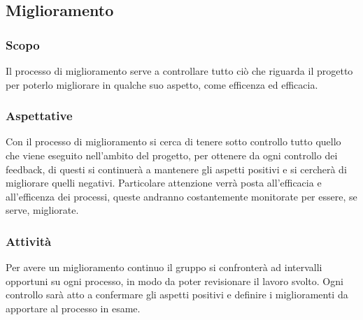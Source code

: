 \subsection{Miglioramento}
\subsubsection{Scopo}
Il processo di miglioramento serve a controllare tutto ciò che riguarda il progetto per poterlo migliorare in qualche suo aspetto, come efficenza ed efficacia.
\subsubsection{Aspettative}
Con il processo di miglioramento si cerca di tenere sotto controllo tutto quello che viene eseguito nell'ambito del progetto, per ottenere da ogni controllo dei feedback, di questi si continuerà a mantenere gli aspetti positivi e si cercherà di migliorare quelli negativi. Particolare attenzione verrà posta all'efficacia e all'efficenza dei processi, queste andranno costantemente monitorate per essere, se serve, migliorate.
\subsubsection{Attività}
Per avere un miglioramento continuo il gruppo si confronterà ad intervalli opportuni su ogni processo, in modo da poter revisionare il lavoro svolto. Ogni controllo sarà atto a confermare gli aspetti positivi e definire i miglioramenti da apportare al processo in esame.
